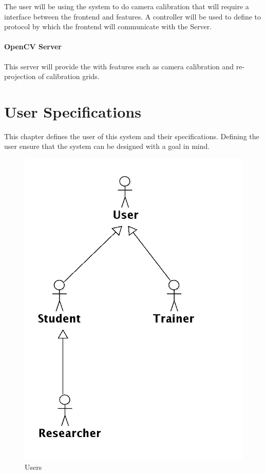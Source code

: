 \documentclass[11pt]{report}
\begin{document}
The user will be using the system to do camera calibration that will require a interface between the frontend and  features. A controller will be used to define to protocol by which the frontend will communicate with the  Server. 

\subsubsection{OpenCV Server}

This server will provide the  with  features such as camera calibration and re-projection of calibration grids.

\chapter{User Specifications}

This chapter defines the user of this system and their specifications. Defining the user ensure that the system can be designed with a  goal in mind. 

\begin{figure}[htp]
\centering
\includegraphics[scale=0.25]{images/UserOverview.png}
\caption{Users}
\label{fig:uo}
\end{figure}
\end{document}
